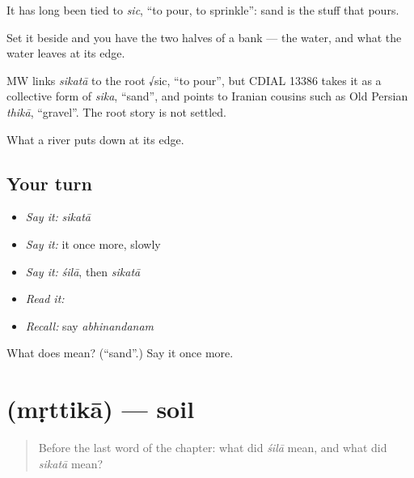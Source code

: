 It has long been tied to \emph{sic}, \textquotedblleft{}to pour, to sprinkle\textquotedblright{}: sand is the stuff that pours.

Set it beside  and you have the two halves of a bank — the water, and what the water leaves at its edge.

\begin{cousinweb}
MW links \emph{sikatā} to the root √sic, \textquotedblleft{}to pour\textquotedblright{}, but CDIAL 13386 takes it as a collective form of \emph{sika}, \textquotedblleft{}sand\textquotedblright{}, and points to Iranian cousins such as Old Persian \emph{thikā}, \textquotedblleft{}gravel\textquotedblright{}. The root story is not settled.
\end{cousinweb}

\begin{grammarlens}[title={What you've built}]
What a river puts down at its edge.
\end{grammarlens}

\subsection*{Your turn}
\begin{itemize}
\raggedright
  \item \emph{Say it:} \emph{sikatā}
  \item \emph{Say it:} it once more, slowly
  \item \emph{Say it:} \emph{śilā}, then \emph{sikatā}
  \item \emph{Read it:} \textbf{}
  \item \emph{Recall:} say \emph{abhinandanam}
\end{itemize}

\begin{tcolorbox}[breakable,colback=teal!4,colframe=teal!35!black,title={Before you move on}]
What does  mean? (\textquotedblleft{}sand\textquotedblright{}.) Say it once more.
\end{tcolorbox}
\section[\texorpdfstring{\sk{मृत्तिका} (mṛttikā)}{मृत्तिका (mṛttikā)}]{ (mṛttikā) — soil}

\label{lesson:SA-C38-soil}



\begin{quote}
Before the last word of the chapter: what did \emph{śilā} mean, and what did \emph{sikatā} mean?
\end{quote}

